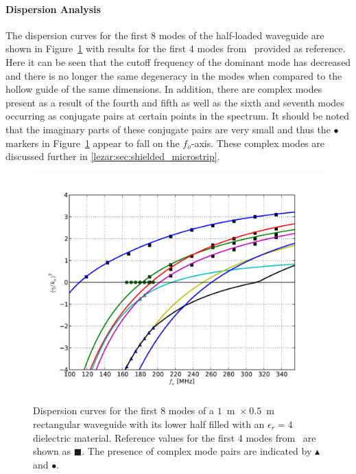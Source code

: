 \paragraph{Dispersion Analysis}

The dispersion curves for the first 8 modes of the half-loaded
waveguide are shown in
Figure~\ref{lezar:fig:half_loaded_rectangular_dispersion_curves} with
results for the first 4 modes from~\cite{Jin2002} provided as
reference. Here it can be seen that the cutoff frequency of the
dominant mode has decreased and there is no longer the same degeneracy
in the modes when compared to the hollow guide of the same
dimensions. In addition, there are complex modes present as a result
of the fourth and fifth as well as the sixth and seventh modes
occurring as conjugate pairs at certain points in the spectrum. It
should be noted that the imaginary parts of these conjugate pairs are
very small and thus the $\bullet$ markers in
Figure~\ref{lezar:fig:half_loaded_rectangular_dispersion_curves} appear to
fall on the $f_o$-axis.  These complex modes are discussed further in
\ref{lezar:sec:shielded_microstrip}.
\begin{figure}
 \centering
 \includegraphics[width=\largefig]{chapters/lezar/pdf/half_loaded_dispersion_curve.pdf}
 \caption{Dispersion curves for the first 8 modes of a
   $1$~m~$\times~0.5$~m rectangular waveguide with its lower half
   filled with an $\epsilon_r = 4$ dielectric material.  Reference
   values for the first 4 modes from~\cite{Jin2002} are shown as
   $\blacksquare$.  The presence of complex mode pairs are indicated
   by $\blacktriangle$ and $\bullet$.}
 \label{lezar:fig:half_loaded_rectangular_dispersion_curves}
\end{figure}
